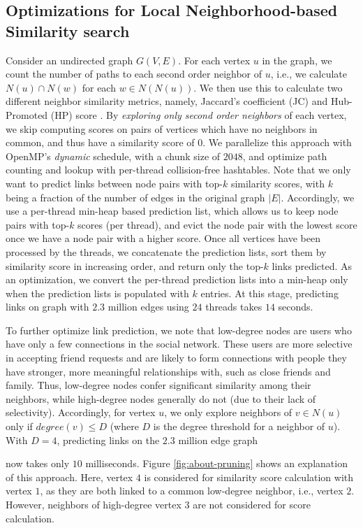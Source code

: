 \subsection{Optimizations for Local Neighborhood-based Similarity search}
\label{sec:leiden}

Consider an undirected graph $G(V, E)$. For each vertex $u$ in the graph, we count the number of paths to each second order neighbor of $u$, i.e., we calculate $N(u) \cap N(w)$ for each $w \in N(N(u))$. We then use this to calculate two different neighbor similarity metrics, namely, Jaccard's coefficient (JC) and Hub-Promoted (HP) score \cite{gatadi2023lpcd}. By \textit{exploring only second order neighbors} of each vertex, we skip computing scores on pairs of vertices which have no neighbors in common, and thus have a similarity score of $0$. We parallelize this approach with OpenMP's \textit{dynamic} schedule, with a chunk size of $2048$, and optimize path counting and lookup with per-thread collision-free hashtables. Note that we only want to predict links between node pairs with top-$k$ similarity scores, with $k$ being a fraction of the number of edges in the original graph $|E|$. Accordingly, we use a per-thread min-heap based prediction list, which allows us to keep node pairs with top-$k$ scores (per thread), and evict the node pair with the lowest score once we have a node pair with a higher score. Once all vertices have been processed by the threads, we concatenate the prediction lists, sort them by similarity score in increasing order, and return only the top-$k$ links predicted. As an optimization, we convert the per-thread prediction lists into a min-heap only when the prediction lists is populated with $k$ entries. At this stage, predicting links on graph with $2.3$ million edges using $24$ threads takes $14$ seconds.

To further optimize link prediction, we note that low-degree nodes are users who have only a few connections in the social network. These users are more selective in accepting friend requests and are likely to form connections with people they have stronger, more meaningful relationships with, such as close friends and family. Thus, low-degree nodes confer significant similarity among their neighbors, while high-degree nodes generally do not (due to their lack of selectivity). Accordingly, for vertex $u$, we only explore neighbors of $v \in N(u)$ only if $degree(v) \leq D$ (where $D$ is the degree threshold for a neighbor of $u$). With $D = 4$, predicting links on the $2.3$ million edge graph now takes only $10$ milliseconds. Figure \ref{fig:about-pruning} shows an explanation of this approach. Here, vertex $4$ is considered for similarity score calculation with vertex $1$, as they are both linked to a common low-degree neighbor, i.e., vertex $2$. However, neighbors of high-degree vertex $3$ are not considered for score calculation.



